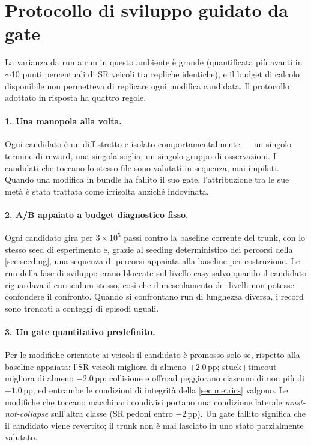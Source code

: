 \section{Protocollo di sviluppo guidato da gate}
\label{sec:gate}

La varianza da run a run in questo ambiente è grande (quantificata più
avanti in $\sim$10 punti percentuali di SR veicoli tra repliche
identiche), e il budget di calcolo disponibile non permetteva di
replicare ogni modifica candidata. Il protocollo adottato in risposta ha
quattro regole.

\paragraph{1. Una manopola alla volta.}
Ogni candidato è un diff stretto e isolato comportamentalmente --- un
singolo termine di reward, una singola soglia, un singolo gruppo di
osservazioni. I candidati che toccano lo stesso file sono valutati in
sequenza, mai impilati. Quando una modifica in bundle ha fallito il suo
gate, l'attribuzione tra le sue metà è stata trattata come irrisolta
anziché indovinata.

\paragraph{2. A/B appaiato a budget diagnostico fisso.}
Ogni candidato gira per $3\times10^{5}$ passi contro la baseline
corrente del trunk, con lo stesso seed di esperimento e, grazie al
seeding deterministico dei percorsi della \cref{sec:seeding}, una
sequenza di percorsi appaiata alla baseline per costruzione. Le run
della fase di sviluppo erano bloccate sul livello easy salvo quando il
candidato riguardava il curriculum stesso, così che il mescolamento dei
livelli non potesse confondere il confronto. Quando si confrontano run
di lunghezza diversa, i record sono troncati a conteggi di episodi
uguali.

\paragraph{3. Un gate quantitativo predefinito.}
Per le modifiche orientate ai veicoli il candidato è promosso solo se,
rispetto alla baseline appaiata: l'SR veicoli migliora di almeno
$+2.0$\,pp; stuck$+$timeout migliora di almeno $-2.0$\,pp; collisione e
offroad peggiorano ciascuno di non più di $+1.0$\,pp; ed entrambe le
condizioni di integrità della \cref{sec:metrics} valgono. Le modifiche
che toccano macchinari condivisi portano una condizione laterale
\emph{must-not-collapse} sull'altra classe (SR pedoni entro $-2$\,pp).
Un gate fallito significa che il candidato viene revertito; il trunk non
è mai lasciato in uno stato parzialmente valutato.

